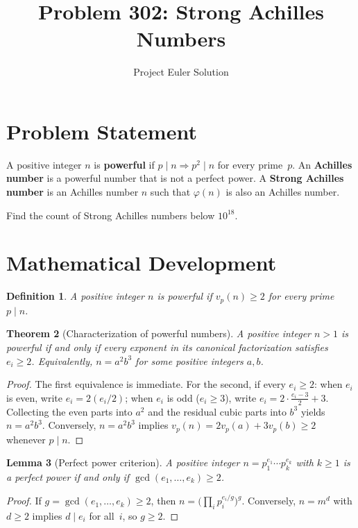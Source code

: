 \documentclass[12pt]{article}
\title{Problem 302: Strong Achilles Numbers}
\author{Project Euler Solution}
\date{}
\newtheorem{theorem}{Theorem}
\newtheorem{lemma}[theorem]{Lemma}
\newtheorem{definition}[theorem]{Definition}
\begin{document}
\maketitle

\section{Problem Statement}
A positive integer $n$ is \textbf{powerful} if $p \mid n \Rightarrow p^2 \mid n$ for every prime~$p$. An \textbf{Achilles number} is a powerful number that is not a perfect power. A \textbf{Strong Achilles number} is an Achilles number $n$ such that $\varphi(n)$ is also an Achilles number.

Find the count of Strong Achilles numbers below $10^{18}$.

\section{Mathematical Development}

\begin{definition}
A positive integer $n$ is \emph{powerful} if $v_p(n) \ge 2$ for every prime $p \mid n$.
\end{definition}

\begin{theorem}[Characterization of powerful numbers]\label{thm:powerful}
A positive integer $n > 1$ is powerful if and only if every exponent in its canonical factorization satisfies $e_i \ge 2$. Equivalently, $n = a^2 b^3$ for some positive integers $a, b$.
\end{theorem}

\begin{proof}
The first equivalence is immediate. For the second, if every $e_i \ge 2$: when $e_i$ is even, write $e_i = 2(e_i/2)$; when $e_i$ is odd ($e_i \ge 3$), write $e_i = 2\cdot\frac{e_i-3}{2} + 3$. Collecting the even parts into $a^2$ and the residual cubic parts into $b^3$ yields $n = a^2 b^3$. Conversely, $n = a^2 b^3$ implies $v_p(n) = 2v_p(a) + 3v_p(b) \ge 2$ whenever $p \mid n$.
\end{proof}

\begin{lemma}[Perfect power criterion]\label{lem:perfect-power}
A positive integer $n = p_1^{e_1} \cdots p_k^{e_k}$ with $k \ge 1$ is a perfect power if and only if $\gcd(e_1, \ldots, e_k) \ge 2$.
\end{lemma}

\begin{proof}
If $g = \gcd(e_1,\ldots,e_k) \ge 2$, then $n = \bigl(\prod_i p_i^{e_i/g}\bigr)^g$. Conversely, $n = m^d$ with $d \ge 2$ implies $d \mid e_i$ for all~$i$, so $g \ge 2$.
\end{proof}
\end{document}
